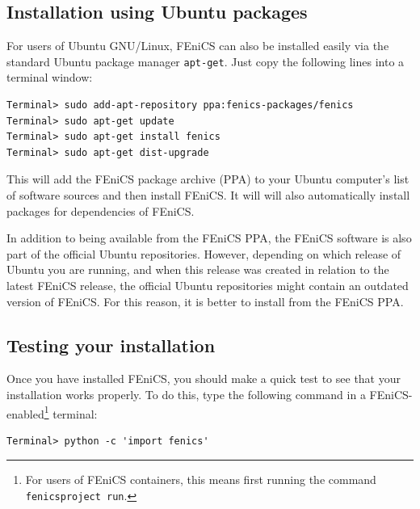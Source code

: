\documentclass[graybox,envcountchap,sectrefs,final]{svmonodo}
\newenvironment{warning_mdfboxadmon}[1][]{
\begin{warning_mdfboxmdframed}[frametitle=#1]
}
{
\end{warning_mdfboxmdframed}
}
\begin{document}

\subsection{Installation using Ubuntu packages}

For users of Ubuntu GNU/Linux, FEniCS can also be installed easily via
the standard Ubuntu package manager \texttt{apt-get}. Just copy the following
lines into a terminal window:


\begin{Verbatim}[frame=lines,label=\fbox{{\tiny Terminal}},framesep=2.5mm,framerule=0.7pt,fontsize=\fontsize{9pt}{9pt}]
Terminal> sudo add-apt-repository ppa:fenics-packages/fenics
Terminal> sudo apt-get update
Terminal> sudo apt-get install fenics
Terminal> sudo apt-get dist-upgrade
\end{Verbatim}

This will add the FEniCS package archive (PPA) to your Ubuntu
computer's list of software sources and then install FEniCS. It will
will also automatically install packages for dependencies of FEniCS.

\begin{warning_mdfboxadmon}
In addition to being available from the FEniCS PPA, the FEniCS
software is also part of the official Ubuntu repositories. However,
depending on which release of Ubuntu you are running, and when this
release was created in relation to the latest FEniCS release, the
official Ubuntu repositories might contain an outdated version of
FEniCS. For this reason, it is better to install from the FEniCS PPA.
\end{warning_mdfboxadmon} %

\subsection{Testing your installation}

Once you have installed FEniCS, you should make a quick test to see
that your installation works properly. To do this, type the following
command in a FEniCS-enabled\footnote{For users of FEniCS containers, this means first running the command \texttt{fenicsproject run}.} terminal:

\begin{Verbatim}[frame=lines,label=\fbox{{\tiny Terminal}},framesep=2.5mm,framerule=0.7pt,fontsize=\fontsize{9pt}{9pt}]
Terminal> python -c 'import fenics'
\end{Verbatim}
\end{document}
